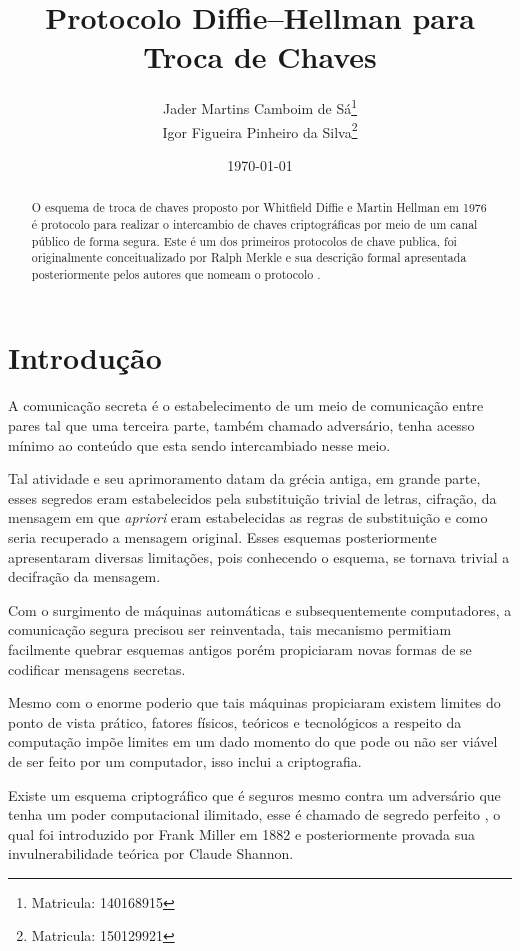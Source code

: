\documentclass{article}
\title{Protocolo Diffie–Hellman para Troca de Chaves}
\author{Jader Martins Camboim de Sá\footnote{Matricula: 140168915}\\
        Igor Figueira Pinheiro da Silva\footnote{Matricula: 150129921}}
\date{\today}
\begin{document}
\maketitle

\begin{abstract}
    O esquema de troca de chaves proposto por Whitfield Diffie e
    Martin Hellman em 1976 é protocolo para realizar
    o intercambio de chaves criptográficas por meio de um canal público
    de forma segura\cite{Diffie}. Este é um dos primeiros protocolos de
    chave publica, foi originalmente conceitualizado por Ralph Merkle
    e sua descrição formal apresentada posteriormente pelos autores que
    nomeam o protocolo \cite{Merkle}.
\end{abstract}

\section{Introdução}%
\label{sec:introducao}
A comunicação secreta é o estabelecimento de um meio de comunicação entre pares
tal que uma terceira parte, também chamado adversário, tenha acesso mínimo ao
conteúdo que esta sendo intercambiado nesse meio.

Tal atividade e seu aprimoramento datam da grécia
antiga\cite{katz2014introduction}, em grande parte, esses segredos eram
estabelecidos pela substituição trivial de letras, cifração, da mensagem em que
\textit{apriori} eram estabelecidas as regras de substituição e como seria recuperado a
mensagem original. Esses esquemas posteriormente apresentaram diversas
limitações, pois conhecendo o esquema, se tornava trivial a decifração da
mensagem.

Com o surgimento de máquinas automáticas e subsequentemente computadores, a
comunicação segura precisou ser reinventada\cite{singh1999code}, tais mecanismo
permitiam facilmente quebrar esquemas antigos porém propiciaram novas formas de
se codificar mensagens secretas\cite{Diffie}.

Mesmo com o enorme poderio que tais máquinas propiciaram existem limites do
ponto de vista prático, fatores físicos, teóricos e tecnológicos a respeito da
computação impõe limites em um dado momento do que pode ou não ser viável de
ser feito por um computador, isso inclui a criptografia.

Existe um esquema criptográfico que é seguros mesmo contra um adversário que
tenha um poder computacional ilimitado, esse é chamado de segredo perfeito
\cite{katz2014introduction}, o qual foi introduzido por Frank Miller em
1882\cite{frankm} e posteriormente provada sua invulnerabilidade teórica
por Claude Shannon\cite{shannon1949communication}.
\end{document}
